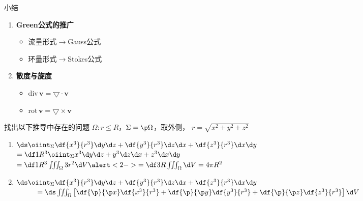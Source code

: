 \begin{frame}{小结}
	\linespread{1.5}
	\begin{enumerate}
	  \item {\bf Green公式的推广}
	  \begin{itemize}
	    \item 流量形式$\to$Gauss公式
	    \item 环量形式$\to$Stokes公式
	  \end{itemize}
	  \item {\bf 散度与旋度}
	  \begin{itemize}
	    \item $\mathrm{div}\,\bm{v}=\bigtriangledown\cdot\bm{v}$
	    \item $\mathrm{rot}\,\bm{v}=\bigtriangledown\times\bm{v}$
	  \end{itemize}
	\end{enumerate}
\end{frame}

% 

\begin{frame}{找出以下推导中存在的问题}
	\linespread{1.8}
		$\Omega:r\leq R$，$\Sigma=\p\Omega$，取外侧，
		$r=\sqrt{x^2+y^2+z^2}$
		\begin{enumerate}
		  \item
		  $\ds\oiint_{\Sigma}\df{x^3}{r^3}\d
		  y\d z+\df{y^3}{r^3}\d z\d x+\df{z^3}{r^3}\d x\d y$\\ {\hspace{1cm}$=\df
		  1{R^3}\oiint_{\Sigma}x^3\d y\d z+y^3\d z\d x+z^3\d x\d y$\\ 
		  \hspace{1cm}$=\df 1{R^3}\iiint_{\Omega}3r^2\d V\alert<2->{=\df
		  3R\iiint_{\Omega}\d V} =4\pi R^2$}\pause\pause
		  
		  \item
		  $\ds\oiint_{\Sigma}\df{x^3}{r^3}\d
		  y\d z+\df{y^3}{r^3}\d z\d x+\df{z^3}{r^3}\d x\d y$\\
		  \alert<4->{$\hspace{1cm}=\ds\iiint_{\Omega}\left[\df{\p}{\p x}\df{x^3}{r^3}+\df{\p}{\p
		  y}\df{y^3}{r^3}+\df{\p}{\p
		  z}\df{z^3}{r^3}\right]\d V$}
		\end{enumerate}
\end{frame}

